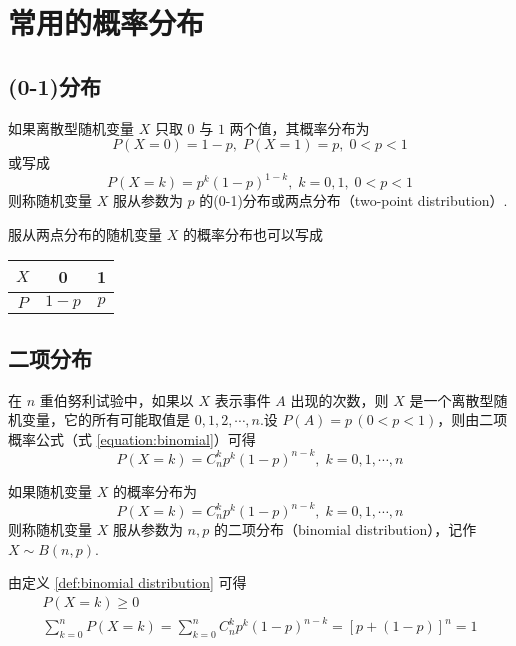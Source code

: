 \section{常用的概率分布}

\subsection{(0-1)分布}

\begin{definition}
    \indent 如果离散型随机变量 $X$ 只取 $0$ 与 $1$ 两个值，其概率分布为
    $$
    P(X=0)=1-p, \; P(X=1)=p, \; 0<p<1
    $$
    或写成
    $$
    P(X=k)=p^k (1-p)^{1-k}, \; k=0,1, \; 0<p<1
    $$
    则称随机变量 $X$ 服从参数为 $p$ 的{\heiti (0-1)分布}或{\heiti 两点分布}（two-point distribution）.
\end{definition}

服从两点分布的随机变量 $X$ 的概率分布也可以写成
\begin{table*}[htbp]
    \centering

    \begin{tabular}{c | c c}
        \hline
        $X$ & 0 & 1 \\
        \hline
        $P$ & $1-p$ & $p$ \\
        \hline
    \end{tabular}
\end{table*}

\subsection{二项分布}

在 $n$ 重伯努利试验中，如果以 $X$ 表示事件 $A$ 出现的次数，则 $X$ 是一个离散型随机变量，它的所有可能取值是 $0,1,2,\cdots,n$.设 $P(A)=p\,(0<p<1)$，则由二项概率公式（式 \eqref{equation:binomial}）可得
$$
P(X=k)=C_n^k p^k (1-p)^{n-k}, \; k=0,1,\cdots,n
$$

\begin{definition}
    \indent 如果随机变量 $X$ 的概率分布为
    $$
    P(X=k)=C_n^k p^k (1-p)^{n-k}, \; k=0,1,\cdots,n
    $$
    则称随机变量 $X$ 服从参数为 $n,p$ 的{\heiti 二项分布}（binomial distribution），记作 $X \sim B(n,p)$.
\end{definition}

由定义 \ref{def:binomial distribution} 可得
\begin{gather*}
    P(X=k) \geqslant 0\\
    \sum_{k=0}^n P(X=k) = \sum_{k=0}^n C_n^k p^k (1-p)^{n-k} = [p+(1-p)]^n=1
\end{gather*}

